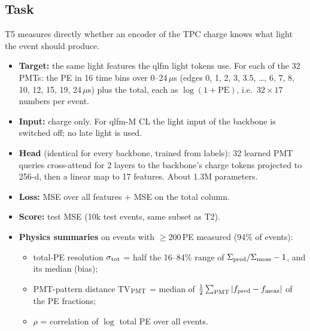 \documentclass[11pt,a4paper]{article}
\begin{document}
\subsection{Task}
T5 measures directly whether an encoder of the TPC charge knows what light the event should produce.
\begin{itemize}
  \item \textbf{Target:} the same light features the qlfm light tokens use. For each of the 32 PMTs: the PE in 16 time bins over 0--24\,$\mu$s (edges 0, 1, 2, 3, 3.5, \dots, 6, 7, 8, 10, 12, 15, 19, 24\,$\mu$s) plus the total, each as $\log(1+\text{PE})$, i.e.\ $32\times17$ numbers per event.
  \item \textbf{Input:} charge only. For qlfm-M CL the light input of the backbone is switched off; no late light is used.
  \item \textbf{Head} (identical for every backbone, trained from labels): 32 learned PMT queries cross-attend for 2 layers to the backbone's charge tokens projected to 256-d, then a linear map to 17 features. About 1.3M parameters.
  \item \textbf{Loss:} MSE over all features + MSE on the total column.
  \item \textbf{Score:} test MSE (10k test events, same subset as T2).
  \item \textbf{Physics summaries} on events with $\geq$200\,PE measured (94\% of events):
  \begin{itemize}
    \item total-PE resolution $\sigma_{\rm tot}$ = half the 16--84\% range of $\Sigma_{\rm pred}/\Sigma_{\rm meas}-1$, and its median (bias);
    \item PMT-pattern distance TV$_{\rm PMT}$ = median of $\frac12\sum_{\rm PMT}|f_{\rm pred}-f_{\rm meas}|$ of the PE fractions;
    \item $\rho$ = correlation of $\log$ total PE over all events.
  \end{itemize}
\end{itemize}
\end{document}
